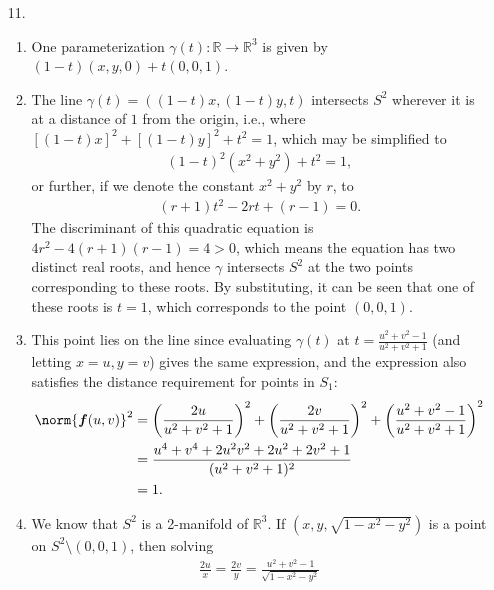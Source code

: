 \documentclass[a4paper,12pt]{article}
\newcommand{\bs}{\boldsymbol}
\theoremstyle{remark}
\begin{document}
\begin{enumerate}
    \item[11.]
        \begin{enumerate}
            \item
                One parameterization $\gamma(t) : \mathbb{R} \to \mathbb{R}^3$ is given by $(1 - t)(x, y, 0) + t(0, 0, 1)$.
            \item
                The line $\gamma(t) = ((1 - t)x, (1 - t)y, t)$ intersects $S^2$ wherever it is at a distance of $1$ from the origin, i.e., where $[(1 - t)x]^2 + [(1 - t)y]^2 + t^2 = 1$, which may be simplified to
                \begin{align*}
                    (1 - t)^2 (x^2 + y^2) + t^2 = 1,
                \end{align*}
                or further, if we denote the constant $x^2 + y^2$ by $r$, to
                \begin{align*}
                    (r + 1)t^2 - 2rt + (r - 1) = 0.
                \end{align*}
                The discriminant of this quadratic equation is $4r^2 - 4(r + 1)(r - 1) = 4 > 0$, which means the equation has two distinct real roots, and hence $\gamma$ intersects $S^2$ at the two points corresponding to these roots. By substituting, it can be seen that one of these roots is $t = 1$, which corresponds to the point $(0, 0, 1)$.
            \item
                This point lies on the line since evaluating $\gamma(t)$ at $t = \frac{u^2 + v^2 - 1}{u^2 + v^2 + 1}$ (and letting $x = u, y = v$) gives the same expression, and the expression also satisfies the distance requirement for points in $S_1$:
                \begin{align*}
                    \norm{\bs{f}(u, v)}^2 &= \left( \frac{2u}{u^2 + v^2 + 1} \right)^2 + \left( \frac{2v}{u^2 + v^2 + 1} \right)^2 + \left( \frac{u^2 + v^2 - 1}{u^2 + v^2 + 1} \right)^2 \\
                    &= \frac{u^4 + v^4 + 2u^2v^2 + 2u^2 + 2v^2 + 1}{(u^2 + v^2 + 1)^2} \\
                    &= 1.
                \end{align*}
            \item
                We know that $S^2$ is a 2-manifold of $\mathbb{R}^3$. If $(x, y, \sqrt{1 - x^2 - y^2})$ is a point on $S^2 \setminus (0, 0, 1)$, then solving
                \begin{align*}
                    \frac{2u}{x} = \frac{2v}{y} = \frac{u^2 + v^2 - 1}{\sqrt{1 - x^2 - y^2}}

\end{align*}
\end{enumerate}
\end{enumerate}
\end{document}
